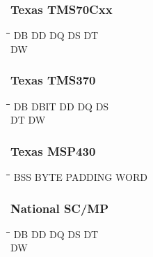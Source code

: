 \subsubsection{Texas TMS70Cxx}
{\tt\begin{tabbing}
\hspace{3cm}\=\hspace{3cm}\=\hspace{3cm}\=\hspace{3cm}\=\kill
DB         \> DD          \> DQ          \> DS          \> DT \\
DW \\
\end{tabbing}}

\subsubsection{Texas TMS370}
{\tt\begin{tabbing}
\hspace{3cm}\=\hspace{3cm}\=\hspace{3cm}\=\hspace{3cm}\=\kill
DB         \> DBIT        \> DD          \> DQ          \> DS \\
DT         \> DW \\
\end{tabbing}}

\subsubsection{Texas MSP430}
{\tt\begin{tabbing}
\hspace{3cm}\=\hspace{3cm}\=\hspace{3cm}\=\hspace{3cm}\=\kill
BSS        \> BYTE        \> PADDING     \> WORD \\
\end{tabbing}}

\subsubsection{National SC/MP}
{\tt\begin{tabbing}
\hspace{3cm}\=\hspace{3cm}\=\hspace{3cm}\=\hspace{3cm}\=\kill
DB         \> DD          \> DQ          \> DS          \> DT \\
DW \\
\end{tabbing}}
	
